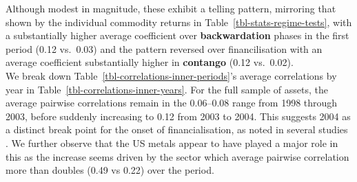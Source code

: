 \documentclass[
  authoryear,
  preprint,
  3p]{elsarticle}
\begin{document}
Although modest in magnitude, these exhibit a telling pattern, mirroring
that shown by the individual commodity returns in
Table~\ref{tbl-stats-regime-tests}, with a substantially higher average
coefficient over \textbf{backwardation} phases in the first period (0.12
vs.~0.03) and the pattern reversed over financilisation with an average
coefficient substantially higher in \textbf{contango} (0.12 vs.~0.02).\\
We break down Table~\ref{tbl-correlations-inner-periods}'s average
correlations by year in Table~\ref{tbl-correlations-inner-years}. For
the full sample of assets, the average pairwise correlations remain in
the 0.06--0.08 range from 1998 through 2003, before suddenly increasing
to 0.12 from 2003 to 2004. This suggests 2004 as a distinct break point
for the onset of financialisation, as noted in several studies
\citep{baker_financialization_2021, tang_index_2012}. We further observe
that the US metals appear to have played a major role in this as the
increase seems driven by the sector which average pairwise correlation
more than doubles (0.49 vs 0.22) over the period.

\medskip
\end{document}
